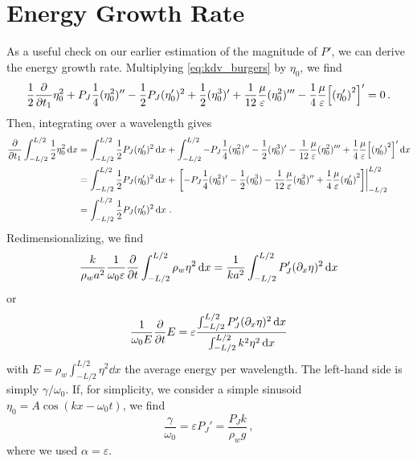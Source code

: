 \documentclass{jfm}
\renewcommand*{\epsilon}{\varepsilon}
\begin{document}
\section{Energy Growth Rate \label{sec:energy_growth_rate}}
As a useful check on our earlier estimation of the magnitude of $P'$, we
can derive the energy growth rate.
Multiplying \cref{eq:kdv_burgers} by $\eta_0$, we find
\begin{equation}
  \frac{1}{2} \pdv{t_1} \eta_0^2 + P_J \frac{1}{4} (\eta_0^2)'' -
  \frac{1}{2} P_J (\eta_0')^2 + \frac{1}{2} (\eta_0^3)' + \frac{1}{12}
  \frac{\mu}{\epsilon} (\eta_0^2)''' - \frac{1}{4} \frac{\mu}{\epsilon}
  \bqty{\pqty{\eta_0'}^2}' = 0 \,.
\end{equation}
Then, integrating over a wavelength gives
\begin{equation}
  \begin{split}
  \pdv{t_1} \int_{-L/2}^{L/2} \frac{1}{2} \eta_0^2 \dd{x} &=
  \int_{-L/2}^{L/2} \frac{1}{2} P_J (\eta_0')^2 \dd{x}
  + \int_{-L/2}^{L/2} -P_J \frac{1}{4} (\eta_0^2)''  - \frac{1}{2} (\eta_0^3)' - \frac{1}{12}
  \frac{\mu}{\epsilon} (\eta_0^2)''' + \frac{1}{4} \frac{\mu}{\epsilon}
  \bqty{\pqty{\eta_0'}^2}' \dd{x}
  \\
  &=
  \int_{-L/2}^{L/2} \frac{1}{2} P_J (\eta_0')^2 \dd{x}
  + \eval{\bqty{-P_J \frac{1}{4} (\eta_0^2)'  - \frac{1}{2} (\eta_0^3) - \frac{1}{12}
  \frac{\mu}{\epsilon} (\eta_0^2)'' + \frac{1}{4} \frac{\mu}{\epsilon}
  \pqty{\eta_0'}^2}}_{-L/2}^{L/2}
  \\
  &=
  \int_{-L/2}^{L/2} \frac{1}{2} P_J (\eta_0')^2 \dd{x}
   \,.
  \end{split}
\end{equation}
Redimensionalizing, we find
\begin{equation}
  \frac{k}{\rho_w a^2} \frac{1}{\omega_0 \epsilon} \pdv{t} \int_{-L/2}^{L/2}
  \rho_w \eta^2 \dd{x} = \frac{1}{k a^2} \int_{-L/2}^{L/2} P_J'
  (\partial_x \eta)^2 \dd{x}
\end{equation}
or
\begin{equation}
  \frac{1}{\omega_0 E} \pdv{t} E =
  \epsilon
  \frac{
    \int_{-L/2}^{L/2} P_J' (\partial_x \eta)^2 \dd{x}
  }
  {
    \int_{-L/2}^{L/2} k^2 \eta^2 \dd{x}
  }
\end{equation}
with $E = \rho_w \int_{-L/2}^{L/2} \eta^2 \dd{x}$ the average
energy per wavelength.
The left-hand side is simply $\gamma/\omega_0$.
If, for simplicity, we consider a simple sinusoid $\eta_0 = A \cos(k x -
\omega_0 t)$, we find
\begin{equation}
  \frac{\gamma}{\omega_0} = \epsilon P_J' = \frac{P_J k}{\rho_w g} \,,
\end{equation}
where we used $\alpha = \epsilon$.



\end{document}
